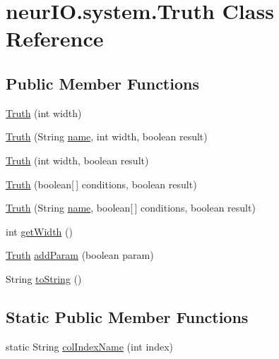 \hypertarget{classneur_i_o_1_1system_1_1_truth}{}\section{neur\+I\+O.\+system.\+Truth Class Reference}
\label{classneur_i_o_1_1system_1_1_truth}
\subsection*{Public Member Functions}
\begin{DoxyCompactItemize}
\item 
\hyperlink{classneur_i_o_1_1system_1_1_truth_a097cc75403bc8483160fb5668f0fd039}{Truth} (int width)
\item 
\hyperlink{classneur_i_o_1_1system_1_1_truth_a448eb40dceba7515b95ad0c408ac9dc0}{Truth} (String \hyperlink{classneur_i_o_1_1system_1_1_truth_a73e0e02b8591832131d0c26d1f88dea2}{name}, int width, boolean result)
\item 
\hyperlink{classneur_i_o_1_1system_1_1_truth_a8241dbb4e9d35b2d8eb95676752a2b3e}{Truth} (int width, boolean result)
\item 
\hyperlink{classneur_i_o_1_1system_1_1_truth_ab07669c710b191e33cc173e0facb9c5c}{Truth} (boolean\mbox{[}$\,$\mbox{]} conditions, boolean result)
\item 
\hyperlink{classneur_i_o_1_1system_1_1_truth_af87a339fee0afc3c42f31770474d8b41}{Truth} (String \hyperlink{classneur_i_o_1_1system_1_1_truth_a73e0e02b8591832131d0c26d1f88dea2}{name}, boolean\mbox{[}$\,$\mbox{]} conditions, boolean result)
\item 
int \hyperlink{classneur_i_o_1_1system_1_1_truth_a842f96b6b8887a8c0efaa6d2b9f1a7c4}{get\+Width} ()
\item 
\hyperlink{classneur_i_o_1_1system_1_1_truth}{Truth} \hyperlink{classneur_i_o_1_1system_1_1_truth_a7f4d8c214884a035c30e6eb9accb4eb3}{add\+Param} (boolean param)
\item 
String \hyperlink{classneur_i_o_1_1system_1_1_truth_ac7f532c2a20156db2b85b799730ee959}{to\+String} ()
\end{DoxyCompactItemize}
\subsection*{Static Public Member Functions}
\begin{DoxyCompactItemize}
\item 
static String \hyperlink{classneur_i_o_1_1system_1_1_truth_a111599cd27bfb1e906cad589313c02d7}{col\+Index\+Name} (int index)
\end{DoxyCompactItemize}
